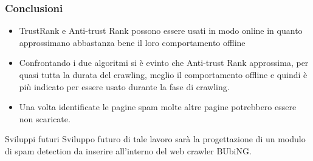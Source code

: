 \documentclass{beamer}
\begin{document}
\begin{frame}
 \frametitle{Conclusioni}
 \begin{itemize}
  \item TrustRank e Anti-trust Rank possono essere usati in modo online in quanto approssimano abbastanza bene il loro comportamento offline
  \item Confrontando i due algoritmi si è evinto che Anti-trust Rank approssima, per quasi tutta la durata del crawling, meglio il comportamento offline e quindi è più indicato per essere usato durante la fase di crawling.
  \item Una volta identificate le pagine spam molte altre pagine potrebbero essere non scaricate.
   \end{itemize}
  \begin{block}{Sviluppi futuri}
    Sviluppo futuro di tale lavoro sarà la progettazione di un modulo di spam detection da inserire all’interno del web crawler BUbiNG.
  \end{block}
\end{frame}
\end{document}
